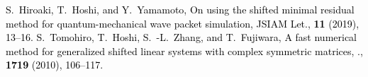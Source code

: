 


\setlength{\baselineskip}{40pt}
\textcolor{black}{
\small
\begin{thebibliography}{7}
	\vspace{-2mm}
		S.~Hiroaki, T.~Hoshi, and Y.~Yamamoto,
		\newblock On using the shifted minimal residual method for quantum-mechanical wave packet simulation,
		JSIAM Let., {\bf 11} (2019), 13--16.
		S.~Tomohiro, T.~Hoshi, S.~-L.~Zhang, and T.~Fujiwara,
		\newblock A fast numerical method for generalized shifted linear systems with complex symmetric matrices,
		., {\bf 1719} (2010), 106--117.
\end{thebibliography}
}


\begin{comment}




	\bibitem{ref-SeitoH-2019}
		S.~Hiroaki, T.~Hoshi, and Y.~Yamamoto,
		\newblock On using the shifted minimal residual method for quantum-mechanical wave packet simulation,
		\newblock JSIAM Let., {\bf 11} (2019), 13--16.
	\bibitem{ref-SogabeT-2010}
		S.~Tomohiro et.al.,
		\newblock A fast numerical method for generalized shifted linear systems with complex symmetric matrices,
		\newblock 数理解析研究所講究録., {\bf 1719} (2010), 106--117.


\end{comment}
